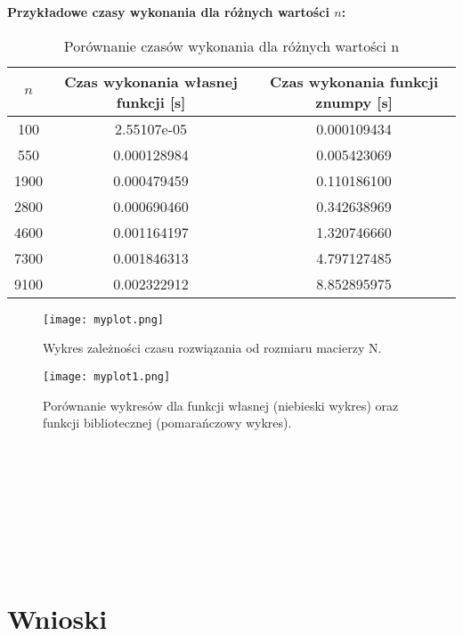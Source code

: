 \documentclass[a4paper,12pt]{article}
\begin{document}
\Large\textbf {{{Przykładowe czasy wykonania dla różnych wartości $n$:}}}

\begin{table}[h!]
\centering
\begin{tabular}{ccc}
\toprule
\( n \) & Czas wykonania własnej funkcji [s] & Czas wykonania funkcji znumpy [s]\\
\midrule
100  & 2.55107e-05 & 0.000109434\\
550  & 0.000128984 & 0.005423069\\
1900 & 0.000479459 & 0.110186100\\
2800 & 0.000690460 & 0.342638969\\
4600 & 0.001164197 & 1.320746660\\
7300 & 0.001846313 & 4.797127485\\
9100 & 0.002322912 & 8.852895975\\


\bottomrule
\end{tabular}
\caption{Porównanie czasów wykonania dla różnych wartości n}
\end{table}

\begin{figure}[H]
    \centering
    \texttt{[image: myplot.png]}
    \caption{Wykres zależności czasu rozwiązania od rozmiaru macierzy N.}
    \label{fig:example-image1}
\end{figure}

\begin{figure}[H]
    \centering
    \texttt{[image: myplot1.png]}
    \caption{Porównanie wykresów dla funkcji własnej (niebieski wykres) oraz funkcji bibliotecznej (pomarańczowy wykres).}
    \label{fig:example-image2}
\end{figure}

\\
\\
\\



\\
\\
\\
\\
\large
\section{Wnioski}
\end{document}
